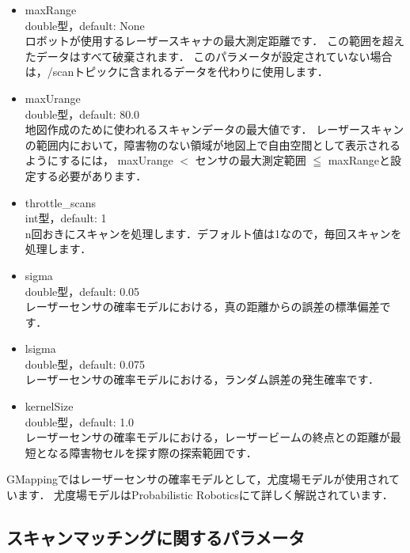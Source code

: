 \documentclass[{../../master}]{subfiles}
\begin{document}
\begin{itemize}
  \item \textsf{maxRange} \\
    double型，default: None\\
    ロボットが使用するレーザースキャナの最大測定距離です．
    この範囲を超えたデータはすべて破棄されます．
    このパラメータが設定されていない場合は，\textsf{/scan}トピックに含まれるデータを代わりに使用します．
  \item \textsf{maxUrange} \\
    double型，default: 80.0 \\
    地図作成のために使われるスキャンデータの最大値です．
    レーザースキャンの範囲内において，障害物のない領域が地図上で自由空間として表示されるようにするには，
    \textsf{maxUrange} $<$ センサの最大測定範囲 $\leqq$ \textsf{maxRange}と設定する必要があります．
  \item \textsf{throttle\_scans} \\
    int型，default: 1 \\
    n回おきにスキャンを処理します．デフォルト値は1なので，毎回スキャンを処理します．
  \item \textsf{sigma} \\
    double型，default: 0.05 \\
    レーザーセンサの確率モデルにおける，真の距離からの誤差の標準偏差です．
  \item \textsf{lsigma} \\
    double型，default: 0.075 \\
    レーザーセンサの確率モデルにおける，ランダム誤差の発生確率です．
  \item \textsf{kernelSize} \\
    double型，default: 1.0 \\
    レーザーセンサの確率モデルにおける，レーザービームの終点との距離が最短となる障害物セルを探す際の探索範囲です．
\end{itemize}

GMappingではレーザーセンサの確率モデルとして，尤度場モデルが使用されています．
尤度場モデルはProbabilistic Robotics\cite{thrun2005probabilistic}にて詳しく解説されています．

\subsection{スキャンマッチングに関するパラメータ}
\end{document}
